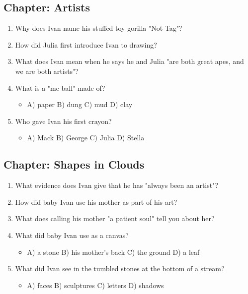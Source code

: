 \documentclass[11pt]{article}
\begin{document}
\subsection*{Chapter: Artists}
\begin{enumerate}
  \item Why does Ivan name his stuffed toy gorilla "Not-Tag"?
  \vspace{0.5in}
  \item How did Julia first introduce Ivan to drawing?
  \vspace{0.5in}
  \item What does Ivan mean when he says he and Julia "are both great apes, and we are both artists"?
  \vspace{0.5in}
  \item What is a "me-ball" made of?
  \begin{itemize}\setlength\itemsep{0pt}
    \item[] A) paper \quad B) dung \quad C) mud \quad D) clay
  \end{itemize}
  \item Who gave Ivan his first crayon?
  \begin{itemize}\setlength\itemsep{0pt}
    \item[] A) Mack \quad B) George \quad C) Julia \quad D) Stella
  \end{itemize}
\end{enumerate}

\subsection*{Chapter: Shapes in Clouds}
\begin{enumerate}
  \item What evidence does Ivan give that he has "always been an artist"?
  \vspace{0.5in}
  \item How did baby Ivan use his mother as part of his art?
  \vspace{0.5in}
  \item What does calling his mother "a patient soul" tell you about her?
  \vspace{0.5in}
  \item What did baby Ivan use as a canvas?
  \begin{itemize}\setlength\itemsep{0pt}
    \item[] A) a stone \quad B) his mother's back \quad C) the ground \quad D) a leaf
  \end{itemize}
  \item What did Ivan see in the tumbled stones at the bottom of a stream?
  \begin{itemize}\setlength\itemsep{0pt}
    \item[] A) faces \quad B) sculptures \quad C) letters \quad D) shadows
  \end{itemize}
\end{enumerate}
\end{document}
